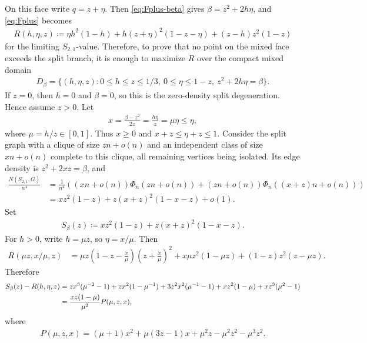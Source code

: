 \documentclass[10pt,a4paper]{article}
\begin{document}
    On this face write $q=z+\eta$.  Then \eqref{eq:Fplus-beta} gives
    $\beta=z^2+2h\eta$, and \eqref{eq:Fplus} becomes
    \begin{align}\label{eq:mixed-R}
      R(h,\eta,z)\coloneqq\eta h^2(1-h)+h(z+\eta)^2(1-z-\eta)+(z-h)z^2(1-z)
    \end{align}
    for the limiting $S_{2,1}$-value.  Therefore, to prove that no point on the
    mixed face exceeds the split branch, it is enough to maximize $R$ over the
    compact mixed domain
    \begin{align*}
      D_\beta=\{(h,\eta,z):0\le h\le z\le1/3,
      \ 0\le \eta\le1-z,
      \ z^2+2h\eta=\beta\}.
    \end{align*}
    If $z=0$, then $h=0$ and $\beta=0$, so this is the zero-density split degeneration.  Hence assume $z>0$.  Let 
    \begin{align*}
      x=\frac{\beta-z^2}{2z}=\frac{h\eta}{z}=\mu\eta\le\eta,
    \end{align*}
    where $\mu=h/z\in[0,1]$.
    Thus $x\ge0$ and $x+z\le\eta+z\le1$.  Consider the split graph with a clique
    of size $zn+o(n)$ and an independent class of size $xn+o(n)$ complete to this
    clique, all remaining vertices being isolated.  Its edge density is
    $z^2+2xz=\beta$, and
    \begin{align*}
      \frac{N(S_{2,1},G)}{n^4}
      &=
      \frac{1}{n^4}\left((xn+o(n))\Phi_n(zn+o(n))
      +(zn+o(n))\Phi_n((x+z)n+o(n))\right)\\
      &=xz^2(1-z)+z(x+z)^2(1-x-z)+o(1).
    \end{align*}
    Set
    \begin{align*}
      S_\beta(z)\coloneqq xz^2(1-z)+z(x+z)^2(1-x-z).
    \end{align*}
    For $h>0$, write $h=\mu z$, so $\eta=x/\mu$.  Then
    \begin{align*}
      R(\mu z,x/\mu,z)
      &=\mu z\left(1-z-\frac{x}{\mu}\right)
      \left(z+\frac{x}{\mu}\right)^2
      +x\mu z^2(1-\mu z)+(1-z)z^2(z-\mu z).
    \end{align*}
    Therefore
    \begin{align}\label{eq:mixed-diff}
      S_\beta(z)-R(h,\eta,z)
      &=zx^3(\mu^{-2}-1)+zx^2(1-\mu^{-1})
        +3z^2x^2(\mu^{-1}-1)+xz^2(1-\mu)+xz^3(\mu^2-1)\notag\\
      &=\frac{xz(1-\mu)}{\mu^2}P(\mu,z,x),
    \end{align}
    where
    \begin{align}\label{eq:Pmixed}
      P(\mu,z,x)=(\mu+1)x^2+\mu(3z-1)x+\mu^2z-\mu^2z^2-\mu^3z^2.
    \end{align}
\end{document}
